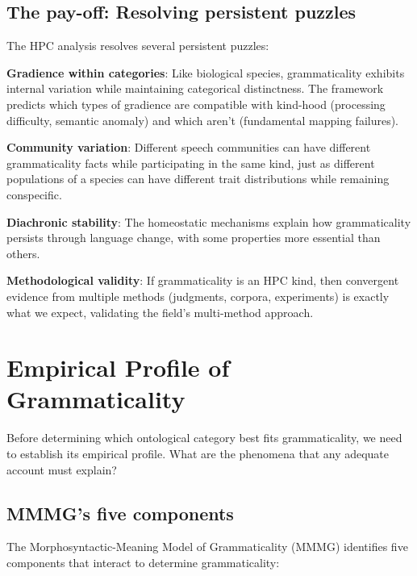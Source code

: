 \documentclass[12pt]{article}
\begin{document}
\subsection{The pay-off: Resolving persistent puzzles}

The HPC analysis resolves several persistent puzzles:

\textbf{Gradience within categories}: Like biological species, grammaticality exhibits internal variation while maintaining categorical distinctness. The framework predicts which types of gradience are compatible with kind-hood (processing difficulty, semantic anomaly) and which aren't (fundamental mapping failures).

\textbf{Community variation}: Different speech communities can have different grammaticality facts while participating in the same kind, just as different populations of a species can have different trait distributions while remaining conspecific.

\textbf{Diachronic stability}: The homeostatic mechanisms explain how grammaticality persists through language change, with some properties more essential than others.

\textbf{Methodological validity}: If grammaticality is an HPC kind, then convergent evidence from multiple methods (judgments, corpora, experiments) is exactly what we expect, validating the field's multi-method approach.

\section{Empirical Profile of Grammaticality}

Before determining which ontological category best fits grammaticality, we need to establish its empirical profile. What are the phenomena that any adequate account must explain?

\subsection{MMMG's five components}

The Morphosyntactic-Meaning Model of Grammaticality (MMMG) identifies five components that interact to determine grammaticality:
\end{document}
